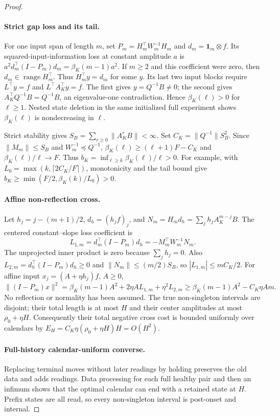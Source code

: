 \documentclass[11pt]{article}
\begin{document}
\begin{proof}
\paragraph{Strict gap loss and its tail.}
For one input span of length $m$, set $P_m=H_m^\top W_m^{-1}H_m$ and
$d_m=\mathbf1_m\otimes f$.
Its squared-input-information loss at constant amplitude $a$ is
$a^2d_m^\top(I-P_m)d_m=\beta_K(m-1)a^2$.
If $m\ge2$ and this coefficient were zero, then $d_m\in\operatorname{range}H_m^\top$.
Thus $H_m^\top y=d_m$ for some $y$. Its last two input blocks require
$L^\top y=f$ and $L^\top A_K^\top y=f$.
The first gives $y=Q^{-1}B\ne0$; the second gives
$A_K^\top Q^{-1}B=Q^{-1}B$, an eigenvalue-one contradiction.
Hence $\beta_K(\ell)>0$ for $\ell\ge1$.
Nested state deletion in the same initialized full experiment shows
$\beta_K(\ell)$ is nondecreasing in $\ell$.

Strict stability gives
$S_B=\sum_{r\ge0}\|A_K^rB\|<\infty$.
Set $C_K=\|Q^{-1}\|S_B^2$.
Since $\|M_m\|\le S_B$ and $W_m^{-1}\preceq Q^{-1}$,
$\beta_K(\ell)\ge(\ell+1)F-C_K$ and $\beta_K(\ell)/\ell\to F$.
Thus $b_K=\inf_{\ell\ge k}\beta_K(\ell)/\ell>0$.
For example, with $L_0=\max(k,\lceil2C_K/F\rceil)$,
monotonicity and the tail bound give
$b_K\ge\min(F/2,\beta_K(k)/L_0)>0$.

\paragraph{Affine non-reflection cross.}
Let $h_j=j-(m+1)/2$, $d_h=(h_jf)_j$, and
$N_m=H_m d_h=\sum_jh_jA_K^{m-j}B$.
The centered constant--slope loss coefficient is
\[
L_{1,m}=d_m^\top(I-P_m)d_h=-M_m^\top W_m^{-1}N_m .
\]
The unprojected inner product is zero because $\sum_jh_j=0$.
Also $L_{2,m}=d_h^\top(I-P_m)d_h\ge0$ and
$\|N_m\|\le(m/2)S_B$, so $|L_{1,m}|\le mC_K/2$.
For affine input $x_j=(A+\eta h_j)f$, $A\ge0$,
\begin{equation}\label{eq:affine}
\| (I-P_m)x\|^2
=\beta_K(m-1)A^2+2\eta A L_{1,m}+\eta^2L_{2,m}
\ge\beta_K(m-1)A^2-C_K\eta A m .
\end{equation}
No reflection or normality has been assumed.
The true non-singleton intervals are disjoint; their total length is at most
$H$ and their center amplitudes at most $\rho_0+\eta H$.
Consequently their total negative cross cost is bounded uniformly over
calendars by $E_H=C_K\eta(\rho_0+\eta H)H=O(H^2)$.

\paragraph{Full-history calendar-uniform converse.}
Replacing terminal moves without later readings by holding preserves the old
data and adds readings. Data processing for each full healthy pair and then
an infimum shows that the optimal calendar can end with a retained state
at $H$. Prefix states are all read, so every non-singleton interval is
post-onset and internal.


\end{proof}
\end{document}
